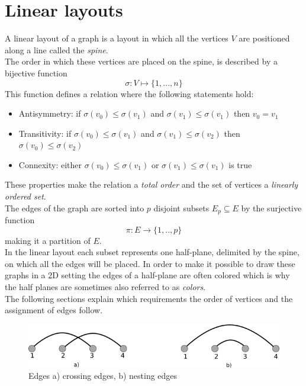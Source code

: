 \section{Linear layouts}
\label{LL}
A linear layout of a graph is a layout in which all the vertices $V$ are positioned along a line called the \textit{spine}.\\
The order in which these vertices are placed on the spine, is described by a bijective function $$\sigma : V \mapsto \{1,...,n\} $$ This function defines a relation where the following statements hold:
\begin{itemize}
\item Antisymmetry: if $\sigma(v_0) \leq \sigma(v_1)$ and $\sigma(v_1) \leq \sigma(v_1)$ then $v_0 = v_1$
\item Transitivity: if $\sigma(v_0) \leq \sigma(v_1)$ and $\sigma(v_1) \leq \sigma(v_2)$ then $\sigma(v_0) \leq \sigma(v_2)$
\item Connexity: either $\sigma(v_0) \leq \sigma(v_1)$ or $\sigma(v_1) \leq \sigma(v_1)$ is true
\end{itemize}
These properties make the relation a \textit{total order} and the set of vertices a \textit{linearly ordered set}.\\
The edges of the graph are sorted into $p$ disjoint subsets $E_p \subseteq E$ by the surjective function 
$$ \pi: E \rightarrow \{1,..,p\} $$ making it a partition of $E$.\\
In the linear layout each subset represents one half-plane, delimited by the spine, on which all the edges will be placed.
In order to make it possible to draw these graphs in a 2D setting the edges of a half-plane are often colored which is why the half planes are sometimes also referred to as \textit{colors}.\\
The following sections explain which requirements the order of vertices and the assignment of edges follow.
\begin{figure}[!h]
\begin{center}
\includegraphics[width=1\textwidth]{figures/CrossingNesting.png}
\caption{Edges a) crossing edges, b) nesting edges}
\label{img:crossNest}
\end{center}
\end{figure}
